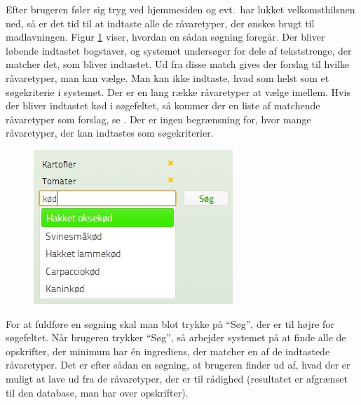 Efter brugeren føler sig tryg ved hjemmesiden og evt.\ har lukket velkomsthilsnen ned, så er det tid til at indtaste alle de råvaretyper, der ønskes brugt til madlavningen. Figur \ref{fig:foodl-soegefelt} viser, hvordan en sådan søgning foregår. Der bliver løbende indtastet bogstaver, og systemet undersøger for dele af tekststrenge, der matcher det, som bliver indtastet. Ud fra disse match gives der forslag til hvilke råvaretyper, man kan vælge. Man kan ikke indtaste, hvad som helst som et søgekriterie i systemet. Der er en lang række råvaretyper at vælge imellem. Hvis der \fx bliver indtastet kød i søgefeltet, så kommer der en liste af matchende råvaretyper som forslag, se . Der er ingen begrænsning for, hvor mange råvaretyper, der kan indtastes som søgekriterier.

\begin{figure}[H]
	\centering
	\includegraphics[scale=0.7]{billeder/foodl/soegefelt.jpg}
	\label{fig:foodl-soegefelt}
\end{figure}


For at fuldføre en søgning skal man blot trykke på ``Søg'', der er til højre for søgefeltet. Når brugeren trykker ``Søg'', så arbejder systemet på at finde alle de opskrifter, der minimum har én ingrediens, der matcher en af de indtastede råvaretyper. Det er efter sådan en søgning, at brugeren finder ud af, hvad der er muligt at lave ud fra de råvaretyper, der er til rådighed (resultatet er afgrænset til den database, man har over opskrifter).
